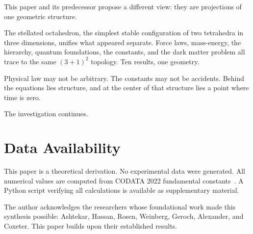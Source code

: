\documentclass[aps,prd,preprint,superscriptaddress,showpacs,preprintnumbers,amsmath,amssymb,nofootinbib]{revtex4-2}
\begin{document}
This paper and its predecessor propose a different view: they are projections of one geometric structure.

The stellated octahedron, the simplest stable configuration of two tetrahedra in three dimensions, unifies what appeared separate. Force laws, mass-energy, the hierarchy, quantum foundations, the constants, and the dark matter problem all trace to the same $(3+1)^2$ topology. Ten results, one geometry.

Physical law may not be arbitrary. The constants may not be accidents. Behind the equations lies structure, and at the center of that structure lies a point where time is zero.

The investigation continues.

\section*{Data Availability}

This paper is a theoretical derivation. No experimental data were generated. All numerical values are computed from CODATA 2022 fundamental constants~\cite{codata2022}. A Python script verifying all calculations is available as supplementary material.

\begin{acknowledgments}
The author acknowledges the researchers whose foundational work made this synthesis possible: Ashtekar, Hassan, Rosen, Weinberg, Geroch, Alexander, and Coxeter. This paper builds upon their established results.
\end{acknowledgments}
\end{document}

